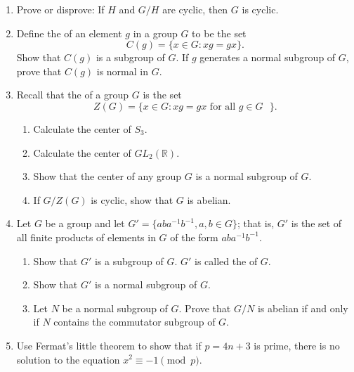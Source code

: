 {{\begin{enumerate}
\item
Prove or disprove: If $H$ and $G/H$ are cyclic, then $G$ is cyclic.
 
 

\item
Define the  of an element $g$ in a group $G$
to be the set  
\[
C(g) = \{ x \in G : xg = gx \}.
\]
Show that $C(g)$ is a subgroup of $G$.  If $g$ generates a normal
subgroup of $G$, prove that $C(g)$ is normal in $G$.
 
 
\item
Recall that the  of a group $G$ is
the set 
\[
Z(G) = \{ x \in G : xg = gx \mbox{ for all $g \in G$ } \}.
\]
\begin{enumerate}
 
 \item
Calculate the center of $S_3$.
 
 \item
Calculate the center of $GL_2 ( {\mathbb R} )$.
 
 \item
Show that the center of any group $G$ is a normal subgroup of $G$. 
 
 \item
If $G / Z(G)$ is cyclic, show that $G$ is abelian.
 
\end{enumerate}

\item
Let $G$ be a group and let $G' = \{ aba^{- 1} b^{-1}, a,b \in G \}$;
that is, $G'$ is the set of all finite products of elements in
$G$ of the form $aba^{-1}b^{-1}$.  
\begin{enumerate}
 \item
Show that $G'$ is a subgroup of $G$. $G'$ is called the
\label{commutatorsubgroup} of $G$.  
 \item
Show that $G'$ is a normal subgroup of $G$.

 \item
Let $N$ be  a normal subgroup of $G$.  Prove that $G/N$ is abelian if
and only if $N$ contains the commutator subgroup of $G$.
 
\end{enumerate}

\item
Use Fermat's little theorem to show that if $p= 4n+3$ is prime, there is no solution to the equation $x^2 \equiv -1 \pmod{p}$.
 

\end{enumerate}}}
